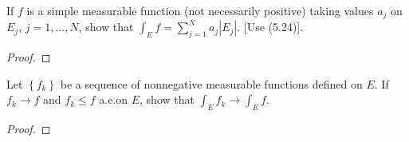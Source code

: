 \begin{problem}
If $f$ is a simple measurable function (not necessarily positive) taking
values $a_j$ on $E_j$, $j=1,...,N$, show that $\int_E f=\sum_{j=1}^N
a_j|E_j|$. [Use (5.24)].
\end{problem}
\begin{proof}
\end{proof}

\begin{problem}
Let $\left\{f_k\right\}$ be a sequence of nonnegative measurable functions
defined on $E$. If $f_k\to f$ and $f_k\leq f$ a.e.\@ on $E$, show that
$\int_E f_k\to\int_E f$.
\end{problem}
\begin{proof}
\end{proof}

